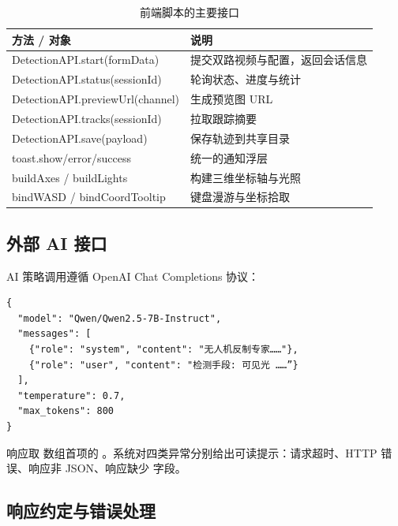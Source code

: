 \begin{table}[H]
\centering
\caption{前端脚本的主要接口}
\label{tab:jsapi}
\small
\begin{tabularx}{\linewidth}{@{}>{\raggedright\ttfamily\scriptsize}p{5.4cm}>{\raggedright\arraybackslash}X@{}}
\toprule
方法 / 对象 & 说明 \\
\midrule
DetectionAPI.start(formData) & 提交双路视频与配置，返回会话信息 \\
DetectionAPI.status(sessionId) & 轮询状态、进度与统计 \\
DetectionAPI.previewUrl(channel) & 生成预览图 URL \\
DetectionAPI.tracks(sessionId) & 拉取跟踪摘要 \\
DetectionAPI.save(payload) & 保存轨迹到共享目录 \\
toast.show/error/success & 统一的通知浮层 \\
buildAxes / buildLights & 构建三维坐标轴与光照 \\
bindWASD / bindCoordTooltip & 键盘漫游与坐标拾取 \\
\bottomrule
\end{tabularx}
\end{table}

\subsection{外部 AI 接口}

AI 策略调用遵循 OpenAI Chat Completions 协议：

\begin{lstlisting}[style=json, basicstyle=\ttfamily\scriptsize, caption={AI 策略的请求体结构}]
{
  "model": "Qwen/Qwen2.5-7B-Instruct",
  "messages": [
    {"role": "system", "content": "无人机反制专家……"},
    {"role": "user", "content": "检测手段: 可见光 ……”}
  ],
  "temperature": 0.7,
  "max_tokens": 800
}
\end{lstlisting}

响应取  数组首项的 。系统对四类异常分别给出可读提示：请求超时、HTTP 错误、响应非 JSON、响应缺少  字段。

\subsection{响应约定与错误处理}

